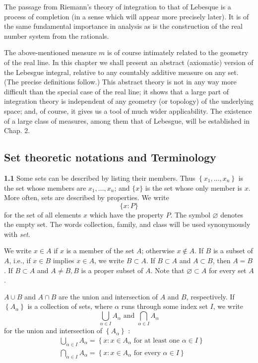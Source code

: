 \documentclass[11pt]{article}
\begin{document}
The passage from Riemann's theory of integration to that of Lebesque is a process of completion (in a sense which will appear more precisely later). It is of the same fundamental importance in analysis as is the construction of the real number system from the rationals.

The above-mentioned measure \(m\) is of course intimately related to the geometry of the real line. In this chapter we shall present an abstract (axiomatic) version of the Lebesgue integral, relative to any countably additive measure on any set. (The precise definitions follow.) This abstract theory is not in any way more difficult than the special case of the real line; it shows that a large part of integration theory is independent of any geometry (or topology) of the underlying space; and, of course, it gives us a tool of much wider applicability. The existence of a large class of measures, among them that of Lebesgue, will be established in Chap. 2.
\subsection{Set theoretic notations and Terminology}
\label{sec:org95b0d43}

\textbf{\textbf{1.1}} Some sets can be described by listing their members. Thus \(\left\{x_1, \ldots, x_n\right\}\) is the set whose members are \(x_1, \ldots, x_n\); and \(\{x\}\) is the set whose only member is \(x\). More often, sets are described by properties. We write
\[\{x: P\}\]
for the set of all elements \(x\) which have the property \(P\). The symbol \(\varnothing\) denotes the empty set. The words collection, family, and class will be used synonymously with \emph{set}.

We write \(x \in A\) if \(x\) is a member of the set \(A\); otherwise \(x \notin A\). If \(B\) is a subset of \(A\), i.e., if \(x \in B\) implies \(x \in A\), we write \(B \subset A\). If \(B \subset A\) and \(A \subset B\), then \(A=B\). If \(B \subset A\) and \(A \neq B, B\) is a proper subset of \(A\). Note that \(\varnothing \subset A\) for every set \(A\).

\(A \cup B\) and \(A \cap B\) are the union and intersection of \(A\) and \(B\), respectively. If \(\left\{A_\alpha\right\}\) is a collection of sets, where \(\alpha\) runs through some index set \(I\), we write
\[\bigcup_{\alpha \in I} A_\alpha \text { and } \bigcap_{\alpha \in I} A_\alpha\]
for the union and intersection of \(\left\{A_\alpha\right\}\) :
\[\begin{aligned}
& \bigcup_{\alpha \in I} A_\alpha=\left\{x: x \in A_\alpha \text { for at least one } \alpha \in I\right\} \\
& \bigcap_{\alpha \in I} A_\alpha=\left\{x: x \in A_\alpha \text { for every } \alpha \in I\right\}
\end{aligned}\]
\end{document}
